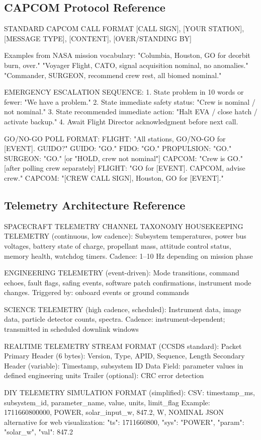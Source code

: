 \documentclass[11pt,letterpaper]{article}
\begin{document}
\subsection{CAPCOM Protocol Reference}

\begin{capcombox}{STANDARD CAPCOM CALL FORMAT}
[CALL SIGN], [YOUR STATION], [MESSAGE TYPE], [CONTENT], [OVER/STANDING BY]

Examples from NASA mission vocabulary:
  "Columbia, Houston, GO for deorbit burn, over."
  "Voyager Flight, CATO, signal acquisition nominal, no anomalies."
  "Commander, SURGEON, recommend crew rest, all biomed nominal."

EMERGENCY ESCALATION SEQUENCE:
  1. State problem in 10 words or fewer: "We have a problem."
  2. State immediate safety status: "Crew is nominal / not nominal."
  3. State recommended immediate action: "Halt EVA / close hatch / activate backup."
  4. Await Flight Director acknowledgment before next call.

GO/NO-GO POLL FORMAT:
  FLIGHT: "All stations, GO/NO-GO for [EVENT]. GUIDO?"
  GUIDO:  "GO."
  FIDO:   "GO."
  PROPULSION: "GO."
  SURGEON:    "GO." [or "HOLD, crew not nominal"]
  CAPCOM: "Crew is GO." [after polling crew separately]
  FLIGHT: "GO for [EVENT]. CAPCOM, advise crew."
  CAPCOM: "[CREW CALL SIGN], Houston, GO for [EVENT]."
\end{capcombox}

\subsection{Telemetry Architecture Reference}

\begin{telebox}{SPACECRAFT TELEMETRY CHANNEL TAXONOMY}
HOUSEKEEPING TELEMETRY (continuous, low cadence):
  Subsystem temperatures, power bus voltages, battery state of charge,
  propellant mass, attitude control status, memory health, watchdog timers.
  Cadence: 1--10 Hz depending on mission phase

ENGINEERING TELEMETRY (event-driven):
  Mode transitions, command echoes, fault flags, safing events,
  software patch confirmations, instrument mode changes.
  Triggered by: onboard events or ground commands

SCIENCE TELEMETRY (high cadence, scheduled):
  Instrument data, image data, particle detector counts, spectra.
  Cadence: instrument-dependent; transmitted in scheduled downlink windows

REALTIME TELEMETRY STREAM FORMAT (CCSDS standard):
  Packet Primary Header (6 bytes): Version, Type, APID, Sequence, Length
  Secondary Header (variable): Timestamp, subsystem ID
  Data Field: parameter values in defined engineering units
  Trailer (optional): CRC error detection

DIY TELEMETRY SIMULATION FORMAT (simplified):
  CSV: timestamp\_ms, subsystem\_id, parameter\_name, value, units, limit\_flag
  Example: 1711660800000, POWER, solar\_input\_w, 847.2, W, NOMINAL
  JSON alternative for web visualization:
    {"ts": 1711660800, "sys": "POWER", "param": "solar\_w", "val": 847.2}
\end{telebox}
\end{document}
